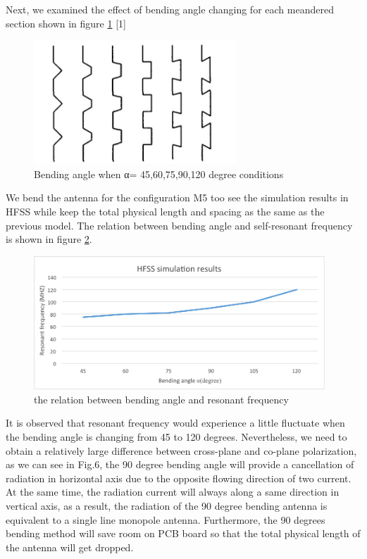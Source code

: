 Next, we examined the effect of bending angle changing for each meandered section shown in figure \ref{fig:efield_fig5} [1]

\begin{figure}[h]
	\begin{center}
		\includegraphics[width=3in]{./images/efield_image4.png}
		\caption{Bending angle when α= 45,60,75,90,120 degree conditions}
		\label{fig:efield_fig5}
	\end{center}
\end{figure}

We bend the antenna for the configuration M5 too see the simulation results in HFSS while keep the total physical length and spacing as the same as the previous model. The relation between bending angle and self-resonant frequency is shown in figure \ref{fig:efield_fig6}.

\begin{figure}[h]
	\begin{center}
		\includegraphics[width=4.3in]{./images/SG_fig5.png}
		\caption{the relation between bending angle and resonant frequency}
		\label{fig:efield_fig6}
	\end{center}
\end{figure}

It is observed that resonant frequency would experience a little fluctuate when the bending angle is changing from 45 to 120 degrees. Nevertheless, we need to obtain a relatively large difference between cross-plane and co-plane polarization, as we can see in Fig.6, the 90 degree bending angle will provide a cancellation of radiation in horizontal axis due to the opposite flowing direction of two current. At the same time, the radiation current will always along a same direction in vertical axis, as a result, the radiation of the 90 degree bending antenna is equivalent to a single line monopole antenna. Furthermore, the 90 degrees bending method will save room on PCB board so that the total physical length of the antenna will get dropped.

